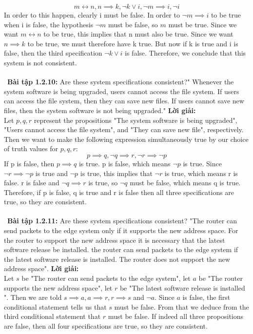 \documentclass[a4paper]{article}
\begin{document}
$$m \leftrightarrow n, n \implies k, \lnot k \lor i, \lnot m \implies i, \lnot i$$
In order to this happen, clearly i must be false. In order to $\lnot m \implies i$ to be true when i is false, the hypothesis $\lnot m$ must be false, so $m$ must be true. Since we want $m \leftrightarrow  n$ to be true, this implies that n must also be true. Since we want $n \implies k$ to be true, we must therefore have k true. But now if k is true and i is false, then the third specification $\lnot k \lor i$ is false. Therefore, we conclude that this system is not consistent.  \\\ \\\
\textbf{Bài tập 1.2.10:}  Are these  system specifications consistent?" Whenever the system software  is being upgraded, users cannot access the file system. If users can access the file system, then they can save new files. If users cannot save new files, then the system software is not being upgraded."
\textbf{Lời giải: } \\Let $p,q,r$ represent the propositions "The system software is being upgraded", "Users cannot access the file system", and "They can save new file", respectively. Then we want to make the following expression simultaneously true by our choice of truth values for $p,q,r$:
$$p \implies q, \lnot q \implies r, \lnot r \implies \lnot p$$
If p is false, then $p \implies q $ is true. p is false, which means $\lnot p $ is true. Since $\lnot r \implies \lnot p$ is true and $\lnot p$ is true, this implies that $\lnot r$ is true, which means r is false. r is false and $\lnot q \implies r$ is true, so $\lnot q$ must be false, which means q is true. Therefore, if p is false, q is true and r is false then all three specifications are true, so they are consistent. 
 \\\ \\\
\textbf{Bài tập 1.2.11:} Are these system specifications consistent? "The router can send packets to the edge system only if it supports the new address space. For the router to support the new address space it is necessary that the latest software release be installed. the router can send packets to the edge system if the latest  software  release is installed. The router does not support the new address space".    
\textbf{Lời giải: } \\Let $s$ be "The router can send packets to the edge system", let $a$ be "The router supports the new address space", let $r$ be "The latest software release is installed ". Then we are told $s \implies a, a \implies r , r \implies s$ and $\lnot a$. Since $a$ is false, the first conditional statement tells us that $s$ must be false. From that we deduce from the third conditional statement that $r$ must be false. If indeed all three propositions are false, then all four specifications are true, so they are consistent.  \\\ \\\
\end{document}
